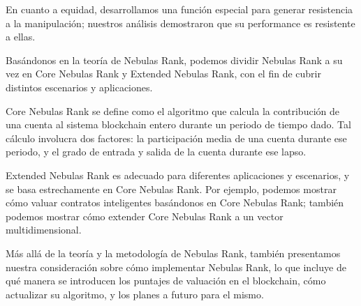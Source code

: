 En cuanto a equidad, desarrollamos una función especial para generar resistencia a la manipulación; nuestros análisis demostraron que su performance es resistente a ellas.

Basándonos en la teoría de Nebulas Rank, podemos dividir Nebulas Rank a su vez en Core Nebulas Rank y Extended Nebulas Rank, con el fin de cubrir distintos escenarios y aplicaciones.

Core Nebulas Rank se define como el algoritmo que calcula la contribución de una cuenta al sistema blockchain entero durante un periodo de tiempo dado. Tal cálculo involucra dos factores: la participación media de una cuenta durante ese periodo, y el grado de entrada y salida de la cuenta durante ese lapso.

Extended Nebulas Rank es adecuado para diferentes aplicaciones y escenarios, y se basa estrechamente en Core Nebulas Rank. Por ejemplo, podemos mostrar cómo valuar contratos inteligentes basándonos en Core Nebulas Rank; también podemos mostrar cómo extender Core Nebulas Rank a un vector multidimensional.

Más allá de la teoría y la metodología de Nebulas Rank, también presentamos nuestra consideración sobre cómo implementar Nebulas Rank, lo que incluye de qué manera se introducen los puntajes de valuación en el blockchain, cómo actualizar su algoritmo, y los planes a futuro para el mismo.

